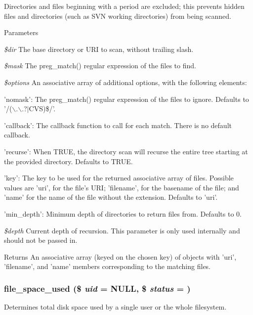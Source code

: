 Directories and files beginning with a period are excluded; this prevents hidden files and directories (such as SVN working directories) from being scanned.


\begin{DoxyParams}{Parameters}
\item[{\em \$dir}]The base directory or URI to scan, without trailing slash. \item[{\em \$mask}]The preg\_\-match() regular expression of the files to find. \item[{\em \$options}]An associative array of additional options, with the following elements:
\begin{DoxyItemize}
\item 'nomask': The preg\_\-match() regular expression of the files to ignore. Defaults to '/($\backslash$.$\backslash$.?$|$CVS)\$/'.
\item 'callback': The callback function to call for each match. There is no default callback.
\item 'recurse': When TRUE, the directory scan will recurse the entire tree starting at the provided directory. Defaults to TRUE.
\item 'key': The key to be used for the returned associative array of files. Possible values are 'uri', for the file's URI; 'filename', for the basename of the file; and 'name' for the name of the file without the extension. Defaults to 'uri'.
\item 'min\_\-depth': Minimum depth of directories to return files from. Defaults to 0. 
\end{DoxyItemize}\item[{\em \$depth}]Current depth of recursion. This parameter is only used internally and should not be passed in.\end{DoxyParams}
\begin{DoxyReturn}{Returns}
An associative array (keyed on the chosen key) of objects with 'uri', 'filename', and 'name' members corresponding to the matching files. 
\end{DoxyReturn}
\hypertarget{group__file_gade600fbda0056f4aaea634e7178215b2}{
\subsubsection[{file\_\-space\_\-used}]{\setlength{\rightskip}{0pt plus 5cm}file\_\-space\_\-used (\$ {\em uid} = {\ttfamily NULL}, \/  \$ {\em status} = {})}}
\label{group__file_gade600fbda0056f4aaea634e7178215b2}
Determines total disk space used by a single user or the whole filesystem.


